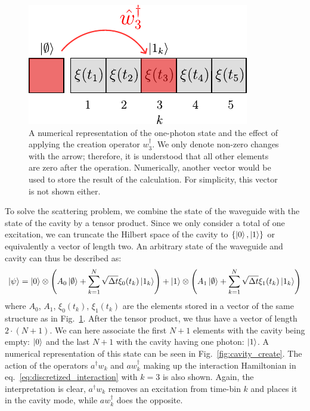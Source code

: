 \begin{figure}[H]
    \centering
    \includegraphics[width=0.5 \linewidth]{figures/one_photon_create.pdf}
    \caption{A numerical representation of the one-photon state and the effect of applying the creation operator $w_3^\dagger$. We only denote non-zero changes with the arrow; therefore, it is understood that all other elements are zero after the operation. Numerically, another vector  would be used to store the result of the calculation. For simplicity, this vector is not shown either.}
    \label{fig:onephoton_representation}
\end{figure}
To solve the scattering problem, we combine the state of the waveguide with the state of the cavity by a tensor product. Since we only consider a total of one excitation, we can truncate the Hilbert space of the cavity to $\{ \ket{0},\ket{1} \}$ or equivalently a vector of length two. An arbitrary state of the waveguide and cavity can thus be described as:
\begin{equation}
    \ket{\psi} = \ket{0} \otimes \left( A_0 \ket{\emptyset}+ \sum_{k=1}^N \sqrt{\Delta t} \xi_0(t_k) \ket{1_k} \right ) + \ket{1} \otimes \left( A_1 \ket{\emptyset}+ \sum_{k=1}^N \sqrt{\Delta t} \xi_1(t_k) \ket{1_k} \right ) 
\end{equation}
where $A_0$, $A_1$, $\xi_0(t_k)$, $\xi_1(t_k)$ are the elements stored in a vector of the same structure as in Fig.~\ref{fig:onephoton_representation}. After the tensor product, we thus have a vector of length $2\cdot(N+1)$. We can here associate the first $N+1$ elements with the cavity being empty: $\ket{0}$ and the last $N+1$ with the cavity having one photon: $\ket{1}$. A numerical representation of this state can be seen in Fig.~\ref{fig:cavity_create}. The action of the operators $a^\dagger w_k$ and $a w_k^\dagger$ making up the interaction Hamiltonian in eq.~\eqref{eq:discretized_interaction} with $k = 3$ is also shown. Again, the interpretation is clear, $a^\dagger w_k$ removes an excitation from time-bin $k$ and places it in the cavity mode, while $a w_k^\dagger$ does the opposite. 


